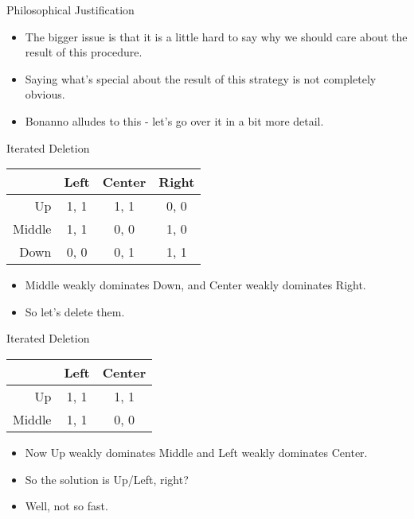 \documentclass[
  ignorenonframetext,
]{beamer}
\providecommand{\tightlist}{%
  \setlength{\itemsep}{0pt}\setlength{\parskip}{0pt}}
\begin{document}
\begin{frame}{Philosophical Justification}
\protect\hypertarget{philosophical-justification}{}

\begin{itemize}
\tightlist
\item
  The bigger issue is that it is a little hard to say why we should care
  about the result of this procedure.
\item
  Saying what's special about the result of this strategy is not
  completely obvious.
\item
  Bonanno alludes to this - let's go over it in a bit more detail.
\end{itemize}

\end{frame}

\begin{frame}{Iterated Deletion}
\protect\hypertarget{iterated-deletion}{}

\begin{table}[!h]
\centering
\begin{tabular}[t]{>{}r|ccc}
\toprule
 & Left & Center & Right\\
\midrule
Up & 1, 1 & 1, 1 & 0, 0\\
Middle & 1, 1 & 0, 0 & 1, 0\\
Down & 0, 0 & 0, 1 & 1, 1\\
\bottomrule
\end{tabular}
\end{table}

\begin{itemize}
\tightlist
\item
  Middle weakly dominates Down, and Center weakly dominates Right.
\item
  So let's delete them.
\end{itemize}

\end{frame}

\begin{frame}{Iterated Deletion}
\protect\hypertarget{iterated-deletion-1}{}

\begin{table}[!h]
\centering
\begin{tabular}[t]{>{}r|cc}
\toprule
 & Left & Center\\
\midrule
Up & 1, 1 & 1, 1\\
Middle & 1, 1 & 0, 0\\
\bottomrule
\end{tabular}
\end{table}

\begin{itemize}
\tightlist
\item
  Now Up weakly dominates Middle and Left weakly dominates Center.
\item
  So the solution is Up/Left, right?
\item
  Well, not so fast.
\end{itemize}

\end{frame}
\end{document}
